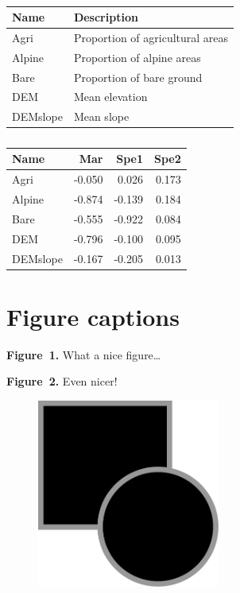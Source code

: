 \documentclass[a4paper,11pt,twoside]{article}
\begin{document}
\newpage
\begin{table}[h!]
  \caption{}
  \label{TabVar}
  \begin{center}
    \begin{tabular}{p{3cm}p{10cm}}
      \hline
      \textbf{Name} & \textbf{Description} \\
      \hline
      Agri & Proportion of agricultural areas \\
      Alpine & Proportion of alpine areas \\
      Bare & Proportion of bare ground \\
      DEM & Mean elevation \\
      DEMslope & Mean slope \\
      \hline
    \end{tabular}
  \end{center}
\end{table}


\newpage
\begin{table}[h!]
  \caption{}
  \label{TabENFA}
  \begin{center}
    \begin{tabular}{lrrr}
      \hline
      \textbf{Name} & \textbf{Mar} & \textbf{Spe1} & \textbf{Spe2} \\
      \hline
      Agri & -0.050 & 0.026 & 0.173 \\
      Alpine & -0.874 & -0.139 & 0.184 \\
      Bare & -0.555 & -0.922 & 0.084 \\
      DEM & -0.796 & -0.100 & 0.095 \\
      DEMslope & -0.167 & -0.205 & 0.013 \\
      \hline
    \end{tabular}
  \end{center}
\end{table}


\newpage
\section*{Figure captions}


\noindent \textbf{Figure~1.} What a nice figure\dots

\bigskip

\noindent \textbf{Figure~2.} Even nicer!


\newpage
\begin{figure}[h!]
  \caption{}
  \label{Fig1}
  \begin{center}
    \includegraphics[width=6cm]{Fig1}
  \end{center}
\end{figure}
\end{document}
